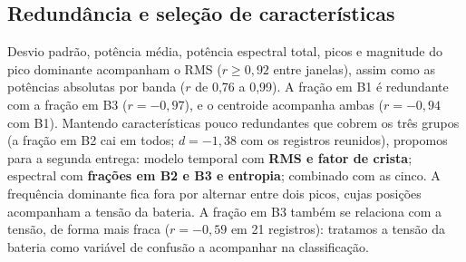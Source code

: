 \subsection{Redundância e seleção de características}
Desvio padrão, potência média, potência espectral total, picos e magnitude do pico dominante acompanham o RMS ($r\geq0{,}92$ entre janelas), assim como as potências absolutas por banda ($r$ de 0,76 a 0,99). A fração em B1 é redundante com a fração em B3 ($r=-0{,}97$), e o centroide acompanha ambas ($r=-0{,}94$ com B1). Mantendo características pouco redundantes que cobrem os três grupos (a fração em B2 cai em todos; $d=-1{,}38$ com os registros reunidos), propomos para a segunda entrega: modelo temporal com \textbf{RMS e fator de crista}; espectral com \textbf{frações em B2 e B3 e entropia}; combinado com as cinco. A frequência dominante fica fora por alternar entre dois picos, cujas posições acompanham a tensão da bateria. A fração em B3 também se relaciona com a tensão, de forma mais fraca ($r=-0{,}59$ em 21 registros): tratamos a tensão da bateria como variável de confusão a acompanhar na classificação.
